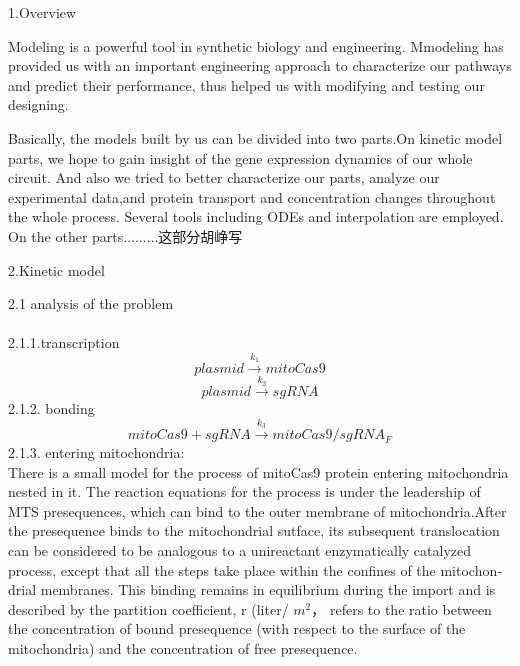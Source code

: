 \documentclass[UTF8]{ctexart}%
\begin{document}
	\begin{center}
		{\Large 1.Overview} 
	\end{center}
   Modeling is a powerful tool in synthetic biology and engineering. Mmodeling has provided us with an important engineering approach to characterize our pathways and predict their performance, thus helped us with modifying and testing our designing.
	
	Basically, the models built by us can be divided into two parts.On kinetic model parts, we hope to gain insight of the gene expression dynamics of our whole circuit. And also we tried to better characterize our parts, analyze our experimental data,and protein transport and concentration changes throughout the whole process. Several tools including ODEs and interpolation are employed.
	On the other parts.........这部分胡峥写
	\begin{center}
	{\Large 2.Kinetic model} 
    \end{center}
  {\Large 2.1 analysis of the problem} 
\\\\
2.1.1.transcription
	\begin{displaymath}
	plasmid \stackrel{k_1}{\longrightarrow} mitoCas9 
	\end{displaymath}
	\begin{displaymath}
	plasmid\stackrel{k_2}{\longrightarrow}sgRNA
	\end{displaymath}
	2.1.2. bonding
	\begin{displaymath}
	mitoCas9+sgRNA\stackrel{k_3}{\longrightarrow}mitoCas9/sgRNA_F
	\end{displaymath}
	2.1.3. entering mitochondria:\\
There is a small model for the process of mitoCas9 protein entering mitochondria nested in it.
The reaction equations for the process is under the leadership of MTS presequences, which can bind to the outer membrane of mitochondria.After the presequence binds to the mitochondrial sutface, its
subsequent translocation can be considered to be analogous to a unireactant enzymatically catalyzed process, except that all the steps take place within the confines of the mitochon­ drial membranes. This binding remains in equilibrium dur­ing the import and is described by  the partition  coefficient,  r (liter/ 
$m^2$， refers  to the  ratio
between the concentration of bound presequence (with re­spect to the surface of the mitochondria) and the concentra­tion of free presequence. 
\end{document}

